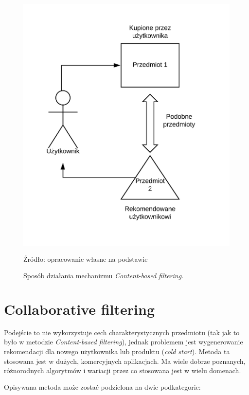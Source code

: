 \begin{figure}
    \centering
    \includegraphics{images/content-based.png}
    \caption{Sposób działania mechanizmu \textit{Content-based filtering}.}
    Źródło: opracowanie własne na podstawie \cite{challenges_solutions_survey}
    \label{fig:content-based}
\end{figure}

\section{Collaborative filtering}

Podejście to nie wykorzystuje cech charakterystycznych przedmiotu (tak jak to było w metodzie \textit{Content-based filtering}), jednak problemem jest wygenerowanie rekomendacji dla nowego użytkownika lub produktu (\textit{cold start}). Metoda ta stosowana jest w dużych, komercyjnych aplikacjach. Ma wiele dobrze poznanych, różnorodnych algorytmów i wariacji przez co stosowana jest w wielu domenach.

Opisywana metoda może zostać podzielona na dwie podkategorie:

